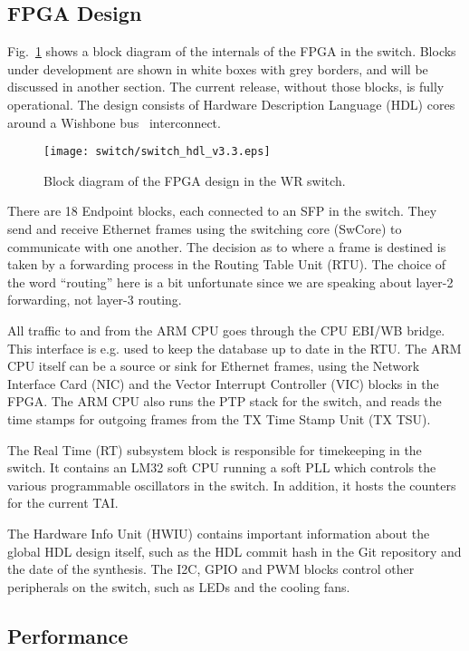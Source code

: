 \documentclass{../JAC2003}
\begin{document}
\subsection{FPGA Design} 

Fig.~\ref{switch-fpga-fig} shows a block diagram of the internals of
the FPGA in the switch. Blocks under development are shown in white
boxes with grey borders, and will be discussed in another section. The
current release, without those blocks, is fully operational. The
design consists of Hardware Description Language (HDL) cores around a
Wishbone bus~\cite{wishbone-ref} interconnect.

\begin{figure}[htb]
   \centering
   \texttt{[image: switch/switch\_hdl\_v3.3.eps]}
   \caption{Block diagram of the FPGA design in the WR switch.}
   \label{switch-fpga-fig}
\end{figure}

There are 18 Endpoint blocks, each connected to an SFP in the
switch. They send and receive Ethernet frames using the switching core
(SwCore) to communicate with one another. The decision as to where a
frame is destined is taken by a forwarding process in the Routing
Table Unit (RTU). The choice of the word ``routing'' here is a bit
unfortunate since we are speaking about layer-2 forwarding, not
layer-3 routing. 

All traffic to and from the ARM CPU goes through the CPU EBI/WB
bridge. This interface is e.g. used to keep the database up to date in
the RTU. The ARM CPU itself can be a source or sink for Ethernet
frames, using the Network Interface Card (NIC) and the Vector
Interrupt Controller (VIC) blocks in the FPGA. The ARM CPU also runs
the PTP stack for the switch, and reads the time stamps for outgoing
frames from the TX Time Stamp Unit (TX TSU).

The Real Time (RT) subsystem block is responsible for timekeeping in
the switch. It contains an LM32 soft CPU running a soft PLL which
controls the various programmable oscillators in the switch. In
addition, it hosts the counters for the current TAI.

The Hardware Info Unit (HWIU) contains important information about the
global HDL design itself, such as the HDL commit hash in the Git
repository and the date of the synthesis. The I2C, GPIO and PWM blocks
control other peripherals on the switch, such as LEDs and the cooling
fans. 

\subsection{Performance}
\end{document}
